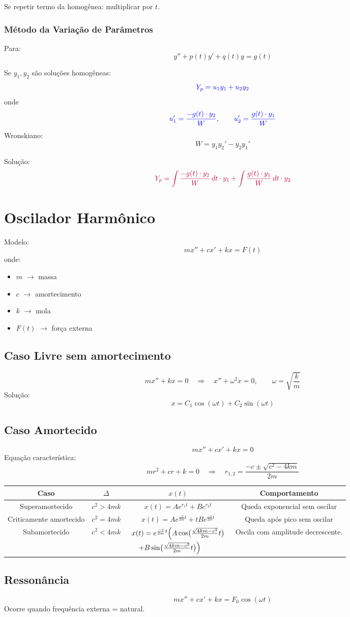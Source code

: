 \documentclass[a4paper,12pt]{article}
\begin{document}
Se repetir termo da homogênea: multiplicar por $t$.

\subsubsection*{Método da Variação de Parâmetros}
Para:
\[
y''+p(t)y'+q(t)y=g(t)
\]

Se $y_1,y_2$ são soluções homogêneas:
\[
\textcolor{blue}{Y_p=u_1y_1+u_2y_2}
\]
onde
\[
\textcolor{blue}{u_1'=\frac{-g(t) \cdot y_2}{W}}, \qquad 
\textcolor{blue}{u_2'=\frac{g(t) \cdot y_1}{W}}
\]
Wronskiano:
\[
W=y_1y_2'-y_2y_1'
\]

Solução:
\[
\textcolor{purple}{Y_p =\int\frac{-g(t) \cdot y_2}{W}\,dt \cdot y_1 +\int\frac{g(t) \cdot y_1}{W}\,dt \cdot y_2}
\]

\section*{Oscilador Harmônico}
Modelo:
\[
m x'' + c x' + k x = F(t)
\]
onde:
\begin{itemize}
    \item $m$ $\to$ massa
    \item $c$ $\to$ amortecimento
    \item $k$ $\to$ mola
    \item $F(t)$ $\to$ força externa
\end{itemize}

\subsection*{Caso Livre sem amortecimento}
\[
m x''+k x=0 \quad\Rightarrow\quad x''+\omega^2 x=0,\qquad \omega=\sqrt{\frac{k}{m}}
\]
Solução:
\[
x=C_1\cos(\omega t)+C_2\sin(\omega t)
\]

\subsection*{Caso Amortecido}
\[
m x''+c x'+k x=0
\]
Equação característica:
\[
m r^2+c r+k=0 \quad\Rightarrow\quad r_{1,2}=\frac{-c \pm \sqrt{c^2-4km}}{2m}
\]
\begin{center}
\begin{tabular}{|c|c|c|c|}
\hline
\textbf{Caso} & $\Delta$ & $x(t)$ & \textbf{Comportamento} \\
\hline
Superamortecido & $c^2>4mk$ & $x(t)=Ae^{r_1t}+Be^{r_2t}$ & Queda exponencial sem oscilar \\
\hline
Criticamente amortecido & $c^2=4mk$ & $x(t)=Ae^{\frac{-c}{2m}t}+t B e^{\frac{-c}{2m}t}$ & Queda após pico sem oscilar \\
\hline
Subamortecido & $c^2<4mk$ & $\begin{array}{l}
x(t)=e^{\frac{-c}{2m}t}\Bigl(A\cos\bigl(\frac{\sqrt{4km-c^2}}{2m}t\bigr)\\[2mm]
\quad + B\sin\bigl(\frac{\sqrt{4km-c^2}}{2m}t\bigr)\Bigr)
\end{array}$ & Oscila com amplitude decrescente. \\
\hline
\end{tabular}
\end{center}

\subsection*{Ressonância}
\[
m x''+c x'+k x=F_0\cos(\omega t)
\]
Ocorre quando frequência externa = natural.
\end{document}
